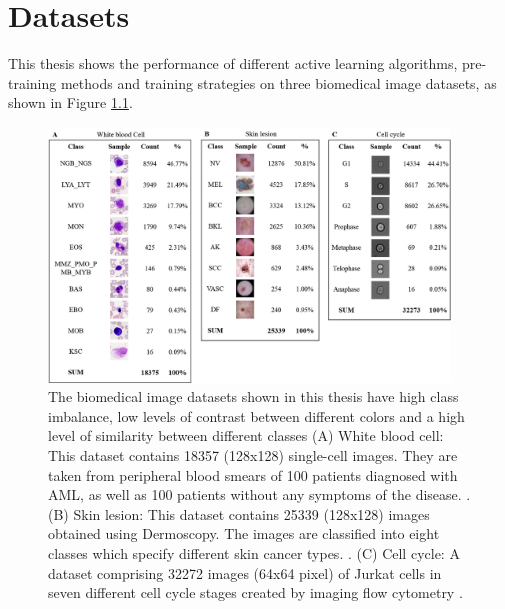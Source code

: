 
\chapter{Datasets}\label{chapter:datasets}
This thesis shows the performance of different active learning algorithms, pre-training methods and training strategies on three biomedical image datasets, as shown in Figure \ref{fig:datasets_composition}.

\begin{figure}[htbp]
\centering
\captionsetup{format=plain}
\includegraphics[width=0.95\textwidth]{figures/fig_datasets_composition.png}
\caption{The biomedical image datasets shown in this thesis have high class imbalance, low levels of contrast between different colors and a high level of similarity between different classes (A) White blood cell: This dataset contains 18357 (128x128) single-cell images. They are taken from peripheral blood smears of 100 patients diagnosed with AML, as well as 100 patients without any symptoms of the disease. \cite{matek2019, clark2013}. (B) Skin lesion: This dataset contains 25339 (128x128) images obtained using Dermoscopy. The images are classified into eight classes which specify different skin cancer types. \cite{codella2018, combalia2019, tschandl2018}. (C) Cell cycle: A dataset comprising 32272 images (64x64 pixel) of Jurkat cells in seven different cell cycle stages created by imaging flow cytometry \cite{eulenberg2017}.}
\label{fig:datasets_composition}
\end{figure}

\newpage

